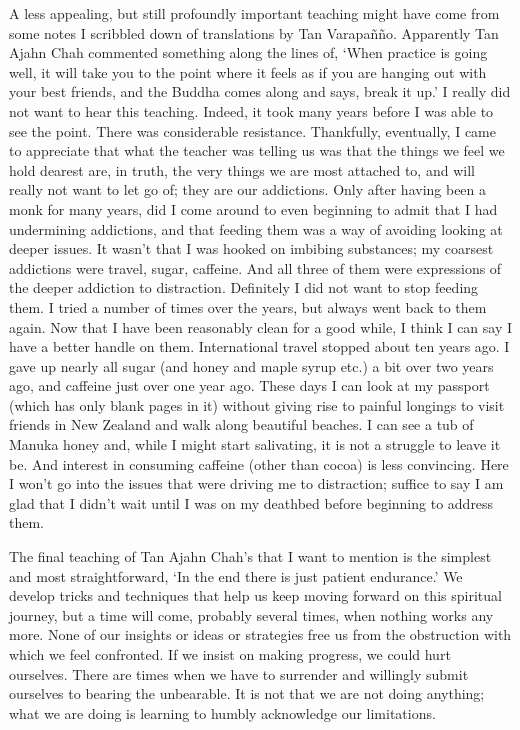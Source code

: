A less appealing, but still profoundly important teaching might have
come from some notes I scribbled down of translations by Tan Varapañño.
Apparently Tan Ajahn Chah commented something along the lines of, `When
practice is going well, it will take you to the point where it feels as
if you are hanging out with your best friends, and the Buddha comes
along and says, break it up.' I really did not want to hear this
teaching. Indeed, it took many years before I was able to see the point.
There was considerable resistance. Thankfully, eventually, I came to
appreciate that what the teacher was telling us was that the things we
feel we hold dearest are, in truth, the very things we are most attached
to, and will really not want to let go of; they are our addictions. Only
after having been a monk for many years, did I come around to even
beginning to admit that I had undermining addictions, and that feeding
them was a way of avoiding looking at deeper issues. It wasn't that I
was hooked on imbibing substances; my coarsest addictions were travel,
sugar, caffeine. And all three of them were expressions of the deeper
addiction to distraction. Definitely I did not want to stop feeding
them. I tried a number of times over the years, but always went back to
them again. Now that I have been reasonably clean for a good while, I think I can say I have a better handle on them. International travel
stopped about ten years ago. I gave up nearly all sugar (and honey and
maple syrup etc.) a bit over two years ago, and caffeine just over one
year ago. These days I can look at my passport (which has only blank
pages in it) without giving rise to painful longings to visit friends in
New Zealand and walk along beautiful beaches. I can see a tub of Manuka
honey and, while I might start salivating, it is not a struggle to leave
it be. And interest in consuming caffeine (other than cocoa) is less convincing. Here I won't go into the issues that were driving me to
distraction; suffice to say I am glad that I didn't wait until I was on
my deathbed before beginning to address them.

The final teaching of Tan Ajahn Chah's that I want to mention is the
simplest and most straightforward, `In the end there is just patient
endurance.' We develop tricks and techniques that help us keep moving
forward on this spiritual journey, but a time will come, probably
several times, when nothing works any more. None of our insights or
ideas or strategies free us from the obstruction with which we feel
confronted. If we insist on making progress, we could hurt ourselves.
There are times when we have to surrender and willingly submit ourselves
to bearing the unbearable. It is not that we are not doing anything;
what we are doing is learning to humbly acknowledge our limitations.

